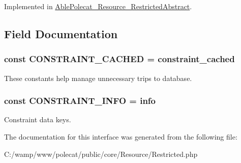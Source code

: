 Implemented in \hyperlink{class_able_polecat___resource___restricted_abstract_a645291218d5ad4046d1367bb9718867f}{Able\+Polecat\+\_\+\+Resource\+\_\+\+Restricted\+Abstract}.



\subsection{Field Documentation}
\hypertarget{interface_able_polecat___resource___restricted_interface_ab27573795ab9be601eaa1e5264d56f79}{}
\subsubsection[{C\+O\+N\+S\+T\+R\+A\+I\+N\+T\+\_\+\+C\+A\+C\+H\+E\+D}]{\setlength{\rightskip}{0pt plus 5cm}const C\+O\+N\+S\+T\+R\+A\+I\+N\+T\+\_\+\+C\+A\+C\+H\+E\+D = \textquotesingle{}constraint\+\_\+cached\textquotesingle{}}\label{interface_able_polecat___resource___restricted_interface_ab27573795ab9be601eaa1e5264d56f79}
These constants help manage unnecessary trips to database. \hypertarget{interface_able_polecat___resource___restricted_interface_a3a1aa131b9d97400218b513393474376}{}
\subsubsection[{C\+O\+N\+S\+T\+R\+A\+I\+N\+T\+\_\+\+I\+N\+F\+O}]{\setlength{\rightskip}{0pt plus 5cm}const C\+O\+N\+S\+T\+R\+A\+I\+N\+T\+\_\+\+I\+N\+F\+O = \textquotesingle{}info\textquotesingle{}}\label{interface_able_polecat___resource___restricted_interface_a3a1aa131b9d97400218b513393474376}
Constraint data keys. 

The documentation for this interface was generated from the following file\+:\begin{DoxyCompactItemize}
\item 
C\+:/wamp/www/polecat/public/core/\+Resource/Restricted.\+php\end{DoxyCompactItemize}
